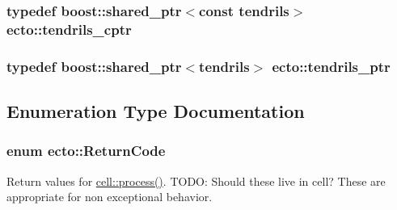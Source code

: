 \subsubsection[{\texorpdfstring{tendrils\+\_\+cptr}{tendrils_cptr}}]{\setlength{\rightskip}{0pt plus 5cm}typedef boost\+::shared\+\_\+ptr$<$const {\bf tendrils}$>$ {\bf ecto\+::tendrils\+\_\+cptr}}\hypertarget{namespaceecto_a6165b23b34082cfc17104ca7e9f1b212}{}\label{namespaceecto_a6165b23b34082cfc17104ca7e9f1b212}
\subsubsection[{\texorpdfstring{tendrils\+\_\+ptr}{tendrils_ptr}}]{\setlength{\rightskip}{0pt plus 5cm}typedef boost\+::shared\+\_\+ptr$<${\bf tendrils}$>$ {\bf ecto\+::tendrils\+\_\+ptr}}\hypertarget{namespaceecto_a89953a225525948cb71d5488c3c6472b}{}\label{namespaceecto_a89953a225525948cb71d5488c3c6472b}


\subsection{Enumeration Type Documentation}
\subsubsection[{\texorpdfstring{Return\+Code}{ReturnCode}}]{\setlength{\rightskip}{0pt plus 5cm}enum {\bf ecto\+::\+Return\+Code}}\hypertarget{namespaceecto_a93d82cd28db695d53963fb696582762c}{}\label{namespaceecto_a93d82cd28db695d53963fb696582762c}


Return values for \hyperlink{structecto_1_1cell_a6b810671ee21f5dddbc1206abfb999f3}{cell\+::process()}. T\+O\+DO\+: Should these live in cell? These are appropriate for non exceptional behavior. 

